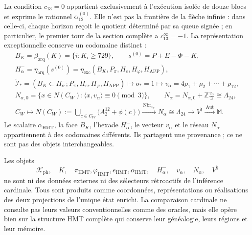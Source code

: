 La condition \(c_{13}=0\) appartient exclusivement à l'exécution isolée de douze blocs et exprime le rationnel \(\alpha_{12}^{(0)}\). Elle n'est pas la frontière de la flèche infinie : dans celle-ci, chaque horizon reçoit le quotient déterminé par sa queue signée ; en particulier, le premier tour de la section complète a \(c_{13}^{\infty}=-1\). La représentation exceptionnelle conserve un codomaine distinct :
\[
 \begin{gathered}
 B_K=\beta_{\mathrm{arq}}(K)=\{i:K_i\ge729\},\qquad
 s^{(0)}=P+E-\Phi-K,\\
 H^-_\alpha=\eta_{\mathrm{arq}}(s^{(0)})
 =\eta_{\mathrm{exc}}(B_K,P_\pi,H_e,H_\varphi,H_{\mathrm{APP}}),\\
 \widetilde{\mathcal I}_*
 =(B_K\subset H^-_\alpha;P_\pi,H_e,H_\varphi,H_{\mathrm{APP}})
 \longmapsto o_*=1
 \longmapsto v_\alpha=4\rho_1+\rho_2+\cdots+\rho_{12},\\
 N_{\alpha,0}
 =\{x\in N(C_W):\langle x,v_\alpha\rangle\equiv0\pmod3\},\qquad
 N_\alpha=N_{\alpha,0}+\mathbb Z\frac{v_\alpha}{3}\cong\Lambda_{24},\\
 C_W\longmapsto
 N(C_W):=\bigcup_{c\in C_W}\bigl(A_2^{12}+\phi(c)\bigr)
 \xrightarrow{\ \operatorname{Nbr}_{v_\alpha}\ }
 N_\alpha\cong\Lambda_{24}
 \longrightarrow V^\natural
 \xrightarrow{\ \operatorname{Aut}\ }\mathbb M.
 \end{gathered}
\]
Le scalaire \(\alpha_{\mathrm{HMT}}\), la face \(B_K\), l’hexade
\(H^-_\alpha\), le vecteur \(v_\alpha\) et le réseau \(N_\alpha\) appartiennent
à des codomaines différents. Ils partagent une provenance ; ce ne sont pas des objets interchangeables.

\begin{proposition}
\label{prop:posterioridad-testigos-ch}
Les objets
\[
 \mathcal K_{\mathrm{ph}},\quad K,\quad
 \pi_{\mathrm{HMT}},\varphi_{\mathrm{HMT}},e_{\mathrm{HMT}},
 \alpha_{\mathrm{HMT}},\quad H^-_\alpha,\quad v_\alpha,\quad
 N_\alpha,\quad V^\natural
\]
ne sont ni des données externes ni des sélecteurs rétroactifs de l'inférence cardinale. Tous sont produits comme coordonnées, représentations ou réalisations des deux projections de l'unique état enrichi. La comparaison cardinale ne consulte pas leurs valeurs conventionnelles comme des oracles, mais elle opère bien sur la structure HMT complète qui conserve leur généalogie, leurs régions et leur mémoire.
\end{proposition}


